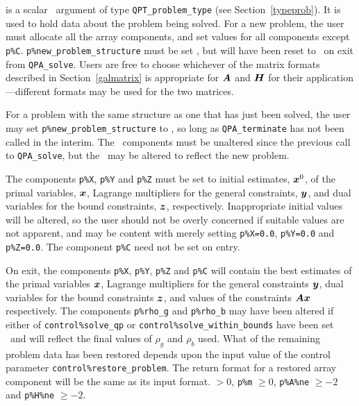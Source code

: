 \documentclass{galahad}
\newcommand{\packagename}{QPA}
\begin{document}
\vspace*{-3mm}
\begin{description}
 is a scalar \intentinout\ argument of type 
{\tt QPT\_problem\_type}
(see Section~\ref{typeprob}). 
It is used to hold data about the problem being solved.
For a new problem, the user must allocate all the array components,
and set values for all components except {\tt p\%C}.
{\tt p\%new\_problem\_structure} must be set \true, but will have been reset
to \false\ on exit from {\tt \packagename\_solve}.
Users are free to choose whichever
of the matrix formats described in Section~\ref{galmatrix} 
is appropriate for ${\bm{A}}$ and ${\bm{H}}$ for their application---different 
formats may be used for the two matrices.

For a problem with the same structure as one that has just been 
solved, the user may set {\tt p\%new\_problem\_str\-u\-cture} to \false,
so long as {\tt \packagename\_terminate} has not been called in the interim.
The \integer\ components must be unaltered since the
previous call to {\tt \packagename\_solve}, but the \realdp\ 
may be altered to reflect the new problem.

The components {\tt p\%X}, {\tt p\%Y} and {\tt p\%Z}
must be set to initial estimates, ${\bm{x}}^{0}$, of the primal variables, 
${\bm{x}}$, Lagrange multipliers for the general constraints, ${\bm{y}}$, 
and dual variables for the bound constraints, ${\bm{z}}$, respectively.
Inappropriate initial values will be altered, so the user should
not be overly concerned if suitable values are not apparent, and may be
content with merely setting {\tt p\%X=0.0},
{\tt p\%Y=0.0} and {\tt p\%Z=0.0}.
The component {\tt p\%C} need not be set on entry.

On exit, the components {\tt p\%X}, {\tt p\%Y}, {\tt p\%Z} and {\tt p\%C}
will contain the best estimates of the primal variables ${\bm{x}}$, 
Lagrange multipliers for the general
constraints ${\bm{y}}$, dual variables for the bound constraints ${\bm{z}}$, 
and values of the constraints ${\bm{A}} {\bm{x}}$ respectively.
The components {\tt p\%rho\_g} and {\tt p\%rho\_b} may have been altered if 
either of {\tt control\%solve\_qp} or {\tt control\%solve\_within\_bounds} 
have been set \true\ and will reflect the final values of $\rho_g$ and $\rho_b$
used. What of the remaining problem data has been restored depends upon
the input value of the control parameter {\tt control\%restore\_problem}.
The return format for a restored array component will be the same as its
input format.
 $> 0$, {\tt p\%m} $\geq 0$,
              {\tt p\%A\%ne} $\geq -2$ and {\tt p\%H\%ne} $\geq -2$.


\end{description}
\end{document}
